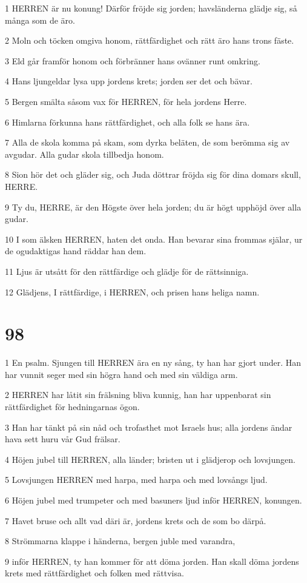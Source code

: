 \par 1 HERREN är nu konung! Därför fröjde sig jorden; havsländerna glädje sig, så många som de äro.
\par 2 Moln och töcken omgiva honom, rättfärdighet och rätt äro hans trons fäste.
\par 3 Eld går framför honom och förbränner hans ovänner runt omkring.
\par 4 Hans ljungeldar lysa upp jordens krets; jorden ser det och bävar.
\par 5 Bergen smälta såsom vax för HERREN, för hela jordens Herre.
\par 6 Himlarna förkunna hans rättfärdighet, och alla folk se hans ära.
\par 7 Alla de skola komma på skam, som dyrka beläten, de som berömma sig av avgudar. Alla gudar skola tillbedja honom.
\par 8 Sion hör det och gläder sig, och Juda döttrar fröjda sig för dina domars skull, HERRE.
\par 9 Ty du, HERRE, är den Högste över hela jorden; du är högt upphöjd över alla gudar.
\par 10 I som älsken HERREN, haten det onda. Han bevarar sina frommas själar, ur de ogudaktigas hand räddar han dem.
\par 11 Ljus är utsått för den rättfärdige och glädje för de rättsinniga.
\par 12 Glädjens, I rättfärdige, i HERREN, och prisen hans heliga namn.

\chapter{98}

\par 1 En psalm. Sjungen till HERREN ära en ny sång, ty han har gjort under. Han har vunnit seger med sin högra hand och med sin väldiga arm.
\par 2 HERREN har låtit sin frälsning bliva kunnig, han har uppenbarat sin rättfärdighet för hedningarnas ögon.
\par 3 Han har tänkt på sin nåd och trofasthet mot Israels hus; alla jordens ändar hava sett huru vår Gud frälsar.
\par 4 Höjen jubel till HERREN, alla länder; bristen ut i glädjerop och lovsjungen.
\par 5 Lovsjungen HERREN med harpa, med harpa och med lovsångs ljud.
\par 6 Höjen jubel med trumpeter och med basuners ljud inför HERREN, konungen.
\par 7 Havet bruse och allt vad däri är, jordens krets och de som bo därpå.
\par 8 Strömmarna klappe i händerna, bergen juble med varandra,
\par 9 inför HERREN, ty han kommer för att döma jorden. Han skall döma jordens krets med rättfärdighet och folken med rättvisa.

